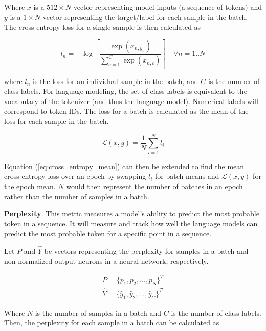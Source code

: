 \documentclass[12pt]{article}
\begin{document}
\noindent
Where $x$ is a $512 \times N$ vector representing model inputs (a sequence of tokens) and $y$ is a $1 \times N$ vector representing the target/label
for each sample in the batch. The cross-entropy loss for a single sample is then calculated as

\begin{equation}\label{eq:cross_entropy_loss}
    l_n = -\log \left[\frac{\exp(x_{n,y_n})}{\sum_{c=1}^{C}\exp(x_{n,c})}\right] \quad \forall n=1..N
\end{equation}

\noindent
where $l_n$ is the loss for an individual sample in the batch, and $C$ is the number of class labels. For language modeling, the set of class labels is equivalent to the vocabulary of the tokenizer (and thus the language model). Numerical labels will correspond to token IDs. The loss for a batch is calculated as the mean of the loss for each sample in the batch.

\begin{equation}\label{eq:cross_entropy_mean}
    \mathcal{L}(x, y) = \frac{1}{N}\sum_{i=1}^{N}l_i
\end{equation}

\noindent
Equation (\ref{eq:cross_entropy_mean}) can then be extended to find the mean cross-entropy loss over an epoch by swapping $l_i$ for batch means and $\mathcal{L}(x, y)$ for the epoch mean. $N$ would then represent the number of batches in an epoch rather than the number of samples in a batch.

\textbf{Perplexity}. This metric measures a model's ability to predict the most probable token in a sequence. It will measure and track how well the language models can predict the most probable token for a specific point in a sequence.

Let $P$ and $\hat{Y}$ be vectors representing the perplexity for samples in a batch and non-normalized output neurons in a neural network, respectively.

\begin{equation}\label{eq:perplexity_defs}
    \begin{gathered}
        P = \{p_1, p_2, ..., p_N\}^T\\
        \hat{Y} = \{\hat{y}_1, \hat{y}_2, ..., \hat{y}_C\}^T
    \end{gathered}
\end{equation}

\noindent
Where $N$ is the number of samples in a batch and $C$ is the number of class labels. Then, the perplexity for each sample in a batch can be calculated as
\end{document}

